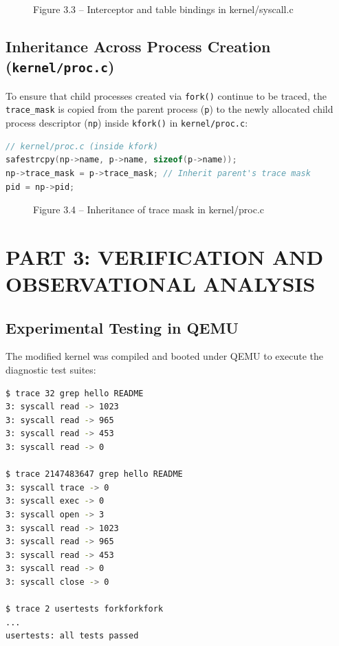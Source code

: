 \documentclass[12pt,a4paper]{report}
\numberwithin{equation}{chapter}
\numberwithin{figure}{chapter}
\numberwithin{table}{chapter}
\begin{document}
\begin{figure}[H]
\centering
\caption{Figure 3.3 -- Interceptor and table bindings in kernel/syscall.c}
\end{figure}

\section{Inheritance Across Process Creation (\texttt{kernel/proc.c})}
To ensure that child processes created via \texttt{fork()} continue to be traced, the \texttt{trace\_mask} is copied from the parent process (\texttt{p}) to the newly allocated child process descriptor (\texttt{np}) inside \texttt{kfork()} in \texttt{kernel/proc.c}:

\begin{lstlisting}[language=C]
// kernel/proc.c (inside kfork)
safestrcpy(np->name, p->name, sizeof(p->name));
np->trace_mask = p->trace_mask; // Inherit parent's trace mask
pid = np->pid;
\end{lstlisting}

\begin{figure}[H]
\centering
\caption{Figure 3.4 -- Inheritance of trace mask in kernel/proc.c}
\end{figure}

\chapter{PART 3: VERIFICATION AND OBSERVATIONAL ANALYSIS}

\section{Experimental Testing in QEMU}
The modified kernel was compiled and booted under QEMU to execute the diagnostic test suites:

\begin{lstlisting}[language=bash]
$ trace 32 grep hello README
3: syscall read -> 1023
3: syscall read -> 965
3: syscall read -> 453
3: syscall read -> 0

$ trace 2147483647 grep hello README
3: syscall trace -> 0
3: syscall exec -> 0
3: syscall open -> 3
3: syscall read -> 1023
3: syscall read -> 965
3: syscall read -> 453
3: syscall read -> 0
3: syscall close -> 0

$ trace 2 usertests forkforkfork
...
usertests: all tests passed
\end{lstlisting}
\end{document}
